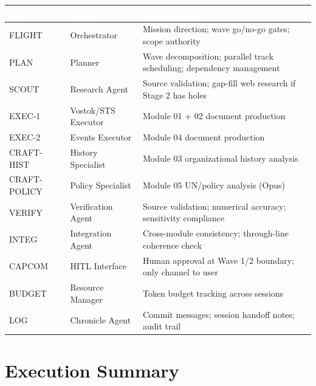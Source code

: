 \documentclass[11pt,letterpaper]{article}
\newcommand{\tableheader}[1]{\textbf{\sffamily\textcolor{white}{#1}}}
\begin{document}
\begin{center}
\begin{tabularx}{\textwidth}{L{2cm}L{3.5cm}X}
\toprule
{}
\tableheader{Role} & \tableheader{Agent} & \tableheader{Responsibility} \\
\midrule
FLIGHT & Orchestrator & Mission direction; wave go/no-go gates; scope authority \\
PLAN & Planner & Wave decomposition; parallel track scheduling; dependency management \\
SCOUT & Research Agent & Source validation; gap-fill web research if Stage 2 has holes \\
EXEC-1 & Vostok/STS Executor & Module 01 + 02 document production \\
EXEC-2 & Events Executor & Module 04 document production \\
CRAFT-HIST & History Specialist & Module 03 organizational history analysis \\
CRAFT-POLICY & Policy Specialist & Module 05 UN/policy analysis (Opus) \\
VERIFY & Verification Agent & Source validation; numerical accuracy; sensitivity compliance \\
INTEG & Integration Agent & Cross-module consistency; through-line coherence check \\
CAPCOM & HITL Interface & Human approval at Wave 1/2 boundary; only channel to user \\
BUDGET & Resource Manager & Token budget tracking across sessions \\
LOG & Chronicle Agent & Commit messages; session handoff notes; audit trail \\
\bottomrule
\end{tabularx}
\end{center}

\section{Execution Summary}
\end{document}
